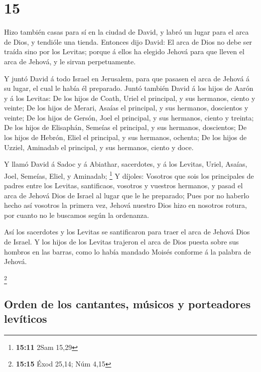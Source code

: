 \hypertarget{section-14}{%
\section{15}\label{section-14}}

 Hizo también casas para sí en la ciudad de David, y labró
un lugar para el arca de Dios, y tendióle una tienda. 
Entonces dijo David: El arca de Dios no debe ser traída sino por los
Levitas; porque á ellos ha elegido Jehová para que lleven el arca de
Jehová, y le sirvan perpetuamente.

 Y juntó David á todo Israel en Jerusalem, para que pasasen
el arca de Jehová á su lugar, el cual le había él preparado.
 Juntó también David á los hijos de Aarón y á los Levitas:
 De los hijos de Coath, Uriel el principal, y sus hermanos,
ciento y veinte;  De los hijos de Merari, Asaías el
principal, y sus hermanos, doscientos y veinte;  De los
hijos de Gersón, Joel el principal, y sus hermanos, ciento y treinta;
 De los hijos de Elisaphán, Semeías el principal, y sus
hermanos, doscientos;  De los hijos de Hebrón, Eliel el
principal, y sus hermanos, ochenta;  De los hijos de
Uzziel, Aminadab el principal, y sus hermanos, ciento y doce.

 Y llamó David á Sadoc y á Abiathar, sacerdotes, y á los
Levitas, Uriel, Asaías, Joel, Semeías, Eliel, y Aminadab; \footnote{\textbf{15:11}
  2Sam 15,29}  Y díjoles: Vosotros que sois los principales
de padres entre los Levitas, santificaos, vosotros y vuestros hermanos,
y pasad el arca de Jehová Dios de Israel al lugar que le he preparado;
 Pues por no haberlo hecho así vosotros la primera vez,
Jehová nuestro Dios hizo en nosotros rotura, por cuanto no le buscamos
según la ordenanza.

 Así los sacerdotes y los Levitas se santificaron para
traer el arca de Jehová Dios de Israel.  Y los hijos de los
Levitas trajeron el arca de Dios puesta sobre sus hombros en las barras,
como lo había mandado Moisés conforme á la palabra de Jehová.

\footnote{\textbf{15:15} Éxod 25,14; Núm 4,15}

\hypertarget{orden-de-los-cantantes-muxfasicos-y-porteadores-levuxedticos}{%
\subsection{Orden de los cantantes, músicos y porteadores
levíticos}\label{orden-de-los-cantantes-muxfasicos-y-porteadores-levuxedticos}}

